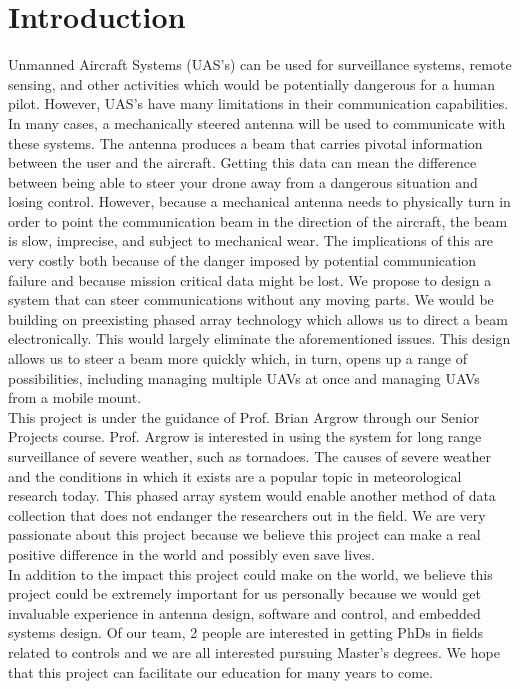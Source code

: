 \documentclass[UROP.tex]{subfiles}
\begin{document}
\bigskip
\section{\Large Introduction}
	Unmanned Aircraft Systems (UAS's) can be used for surveillance systems, remote sensing, and other activities which would be potentially dangerous for a human pilot.  However, UAS's have many limitations in their communication capabilities.  In many cases, a mechanically steered antenna will be used to communicate with these systems. The antenna produces a beam that carries pivotal information between the user and the aircraft.  Getting this data can mean the difference between being able to steer your drone away from a dangerous situation and losing control.  However, because a mechanical antenna needs to physically turn in order to point the communication beam in the direction of the aircraft, the beam is slow, imprecise, and subject to mechanical wear. The implications of this are very costly both because of the danger imposed by potential communication failure and because mission critical data might be lost.  We propose to design a system that can steer communications without any moving parts.  We would be building on preexisting phased array technology which allows us to direct a beam electronically. This would largely eliminate the aforementioned issues.  This design allows us to steer a beam more quickly which, in turn, opens up a range of possibilities, including managing multiple UAVs at once and managing UAVs from a mobile mount.\\
	
	This project is under the guidance of Prof. Brian Argrow through our Senior Projects course. Prof. Argrow is interested in using the system for long range surveillance of severe weather, such as tornadoes.  The causes of severe weather and the conditions in which it exists are a popular topic in meteorological research today.  This phased array system would enable another method of data collection that does not endanger the researchers out in the field.  We are very passionate about this project because we believe this project can make a real positive difference in the world and possibly even save lives.\\
	
	In addition to the impact this project could make on the world, we believe this project could be extremely important for us personally because we would get invaluable experience in antenna design, software and control, and embedded systems design. Of our team, 2 people are interested in getting PhDs in fields related to controls and we are all interested pursuing Master's degrees. We hope that this project can facilitate our education for many years to come.\\
\end{document}

